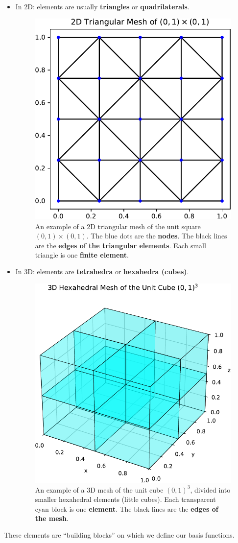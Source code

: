 \begin{itemize}
    \item In 2D: elements are usually \textbf{triangles} or \textbf{quadrilaterals}.
    \begin{figure}[!htp]
        \centering
        \includegraphics[width=.56\textwidth]{img/poisson-1d/mesh-2d.pdf}
        \caption{An example of a 2D triangular mesh of the unit square $(0,1) \times (0,1)$. The blue dots are the \textbf{nodes}. The black lines are the \textbf{edges of the triangular elements}. Each small triangle is one \textbf{finite element}.}
    \end{figure}
    \item In 3D: elements are \textbf{tetrahedra} or \textbf{hexahedra (cubes)}.
    \begin{figure}[!htp]
        \centering
        \includegraphics[width=.66\textwidth]{img/poisson-1d/mesh-3d.pdf}
        \caption{An example of a 3D mesh of the unit cube $\left(0, 1\right)^{3}$, divided into smaller hexahedral elements (little cubes). Each transparent cyan block is one \textbf{element}. The black lines are the \textbf{edges of the mesh}.}
    \end{figure}
\end{itemize}
These elements are ``building blocks'' on which we define our basis functions.

